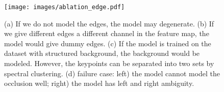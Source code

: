 \documentclass{article}
\begin{document}
\begin{table}[t]
\centering
\caption{\textbf{Ablation tests on variants of edge heatmap generation}. The original design is proved to be the most robust one. Although in some cases it is not optimal, the difference is almost trivial.}
\label{tab:ablation_edge_gen}
\end{table}

\begin{figure}[t]
\begin{center}
  \texttt{[image: images/ablation\_edge.pdf]}
\end{center}
   \caption{(a) If we do not model the edges, the model may degenerate. (b) If we give different edges a different channel in the feature map, the model would give dummy edges. (c) If the model is trained on the dataset with structured background, the background would be modeled. However, the keypoints can be separated into two sets by spectral clustering. (d) failure case: left) the model cannot model the occlusion well; right) the model has left and right ambiguity.}
\label{fig:ablation_edge}
\end{figure}
\end{document}
